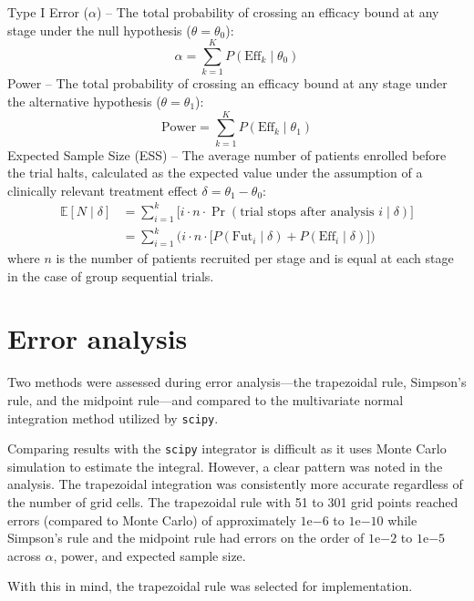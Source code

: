 \documentclass{article}
\begin{document}
Type I Error ($\alpha$) -- The total probability of crossing an efficacy bound at any stage under the null hypothesis ($\theta = \theta_0$):
%
\[
    \alpha = \sum_{k=1}^{K} P(\text{Eff}_k \mid \theta_0)
\]
$$$$
%
Power -- The total probability of crossing an efficacy bound at any stage under the alternative hypothesis ($\theta = \theta_1$):
%
\[
    \text{Power} = \sum_{k=1}^{K} P(\text{Eff}_k \mid \theta_1)
\]
%
Expected Sample Size (ESS) -- The average number of patients enrolled before the trial halts, calculated as the expected value under the assumption of a clinically relevant treatment effect $\delta=\theta_1-\theta_0$:
%
\begin{align}
    \mathbb{E}[N\mid\delta] &= \sum_{i=1}^k \big[i\cdot n\cdot\Pr(\text{trial stops after analysis }i\mid\delta)\big] \\
    &=\sum_{i=1}^k \Big( i\cdot n \cdot \big[ P(\text{Fut}_i \mid \delta) + P(\text{Eff}_i \mid \delta) \big] \Big)
\end{align}
%
where $n$ is the number of patients recruited per stage and is equal at each stage in the case of group sequential trials.
%
\section{Error analysis}
%
Two methods were assessed during error analysis---the trapezoidal rule, Simpson's rule, and the midpoint rule---and compared to the multivariate normal integration method utilized by \texttt{scipy}. 

Comparing results with the \texttt{scipy} integrator is difficult as it uses Monte Carlo simulation to estimate the integral. However, a clear pattern was noted in the analysis. The trapezoidal integration was consistently more accurate regardless of the number of grid cells. The trapezoidal rule with 51 to 301 grid points reached errors (compared to Monte Carlo) of approximately $1\mathrm{e}{-6}$ to $1\mathrm{e}{-10}$ while Simpson's rule and the midpoint rule had errors on the order of $1\mathrm{e}{-2}$ to $1\mathrm{e}{-5}$ across $\alpha$, power, and expected sample size.

With this in mind, the trapezoidal rule was selected for implementation.
%
\appendix
%
\end{document}
